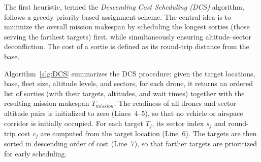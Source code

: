 \documentclass[subscriptcorrection,upint,nolists, varvw,barcolor=Goldenrod3,mathalfa=cal=euler,balance,hyphenate,french]{asmejour} %
\begin{document}


The first heuristic, termed the \emph{Descending Cost Scheduling (DCS)} algorithm, follows a greedy priority-based 
assignment scheme. 
The central idea is to minimize the overall mission makespan by scheduling the longest sorties (those serving the farthest targets) first, while simultaneously ensuring altitude--sector deconfliction.
The cost of a sortie is defined as its round-trip distance from the base.

Algorithm~\ref{alg:DCS} summarizes the DCS procedure: given the target locations, base, fleet size, altitude levels, and sectors, for each drone, it returns an ordered list of sorties (with their targets, altitudes, and wait times) together with the resulting mission makespan $T_{\mathit{mission}}$.
The readiness of all drones and sector–altitude pairs is initialized to zero (Lines~4–5), so that no vehicle or airspace corridor is initially occupied.
For each target $T_j$, its sector index $s_j$ and round-trip cost $c_j$ are computed from the target location (Line~6).
The targets are then sorted in descending order of cost (Line~7), so that farther targets are prioritized for early scheduling.
\end{document}
